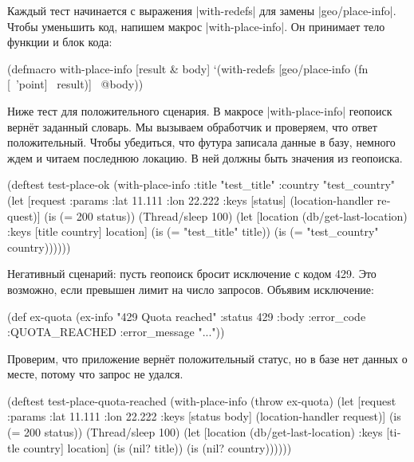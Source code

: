 Каждый тест начинается с выражения \spverb|with-redefs| для замены
\spverb|geo/place-info|. Чтобы уменьшить код, напишем макрос
\spverb|with-place-info|. Он принимает тело функции и блок кода:

\begin{english}
  \begin{clojure}
(defmacro with-place-info
  [result & body]
  `(with-redefs [geo/place-info
                 (fn [~'point] ~result)]
     ~@body))
  \end{clojure}
\end{english}

Ниже тест для положительного сценария. В макросе \spverb|with-place-info|
геопоиск верн\"{е}т заданный словарь. Мы вызываем обработчик и проверяем, что ответ
положительный. Чтобы убедиться, что футура записала данные в базу, немного ждем
и читаем последнюю локацию. В ней должны быть значения из геопоиска.

\begin{english}
  \begin{clojure}
(deftest test-place-ok
  (with-place-info
    {:title "test_title"
     :country "test_country"}
    (let [request {:params {:lat 11.111 :lon 22.222}}
          {:keys [status]} (location-handler request)]
      (is (= 200 status))
      (Thread/sleep 100)
      (let [location (db/get-last-location)
            {:keys [title country]} location]
        (is (= "test_title" title))
        (is (= "test_country" country))))))
  \end{clojure}
\end{english}

Негативный сценарий: пусть геопоиск бросит исключение с кодом 429. Это
возможно, если превышен лимит на число запросов. Объявим исключение:

\begin{english}
  \begin{clojure}
(def ex-quota
  (ex-info "429 Quota reached"
           {:status 429
            :body {:error_code :QUOTA_REACHED
                   :error_message "..."}}))
  \end{clojure}
\end{english}

\noindent
Проверим, что приложение верн\"{е}т положительный статус, но в базе нет данных о
месте, потому что запрос не удался.

\begin{english}
  \begin{clojure}
(deftest test-place-quota-reached
  (with-place-info (throw ex-quota)
    (let [request {:params {:lat 11.111 :lon 22.222}}
          {:keys [status body]} (location-handler request)]
      (is (= 200 status))
      (Thread/sleep 100)
      (let [location (db/get-last-location)
            {:keys [title country]} location]
        (is (nil? title))
        (is (nil? country))))))
  \end{clojure}
\end{english}

